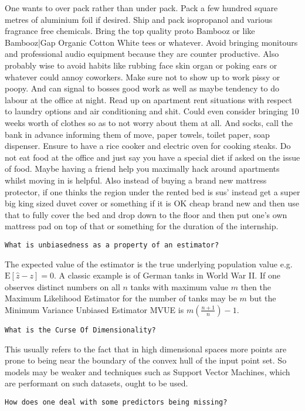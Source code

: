 One wants to over pack rather than under pack. Pack a few hundred square metres of aluminium foil if desired. Ship and pack isopropanol and various fragrance free chemicals. Bring the top quality proto Bambooz or like Bambooz|Gap Organic Cotton White tees or whatever. Avoid bringing monitours and professional audio equipment because they are counter productive. Also probably wise to avoid habits like rubbing face skin organ or poking ears or whatever could annoy coworkers. Make sure not to show up to work pissy or poopy. And can signal to bosses good work as well as maybe tendency to do labour at the office at night. Read up on apartment rent situations with respect to laundry options and air conditioning and shit. Could even consider bringing 10 weeks worth of clothes so as to not worry about them at all. And socks, call the bank in advance informing them of move, paper towels, toilet paper, soap dispenser. Ensure to have a rice cooker and electric oven for cooking steaks. Do not eat food at the office and just say you have a special diet if asked on the issue of food. Maybe having a friend help you maximally hack around apartments whilst moving in is helpful. Also instead of buying a brand new mattress protector, if one thinks the region under the rented bed is sus' instead get a super big king sized duvet cover or something if it is OK cheap brand new and then use that to fully cover the bed and drop down to the floor and then put one's own mattress pad on top of that or something for the duration of the internship.

\texttt{What is unbiasedness as a property of an estimator?}

The expected value of the estimator is the true underlying population value e.g. $\text{E}[\hat{z}-z] = 0$. A classic example is of German tanks in World War II. If one observes distinct numbers on all $n$ tanks with maximum value $m$ then the Maximum Likelihood Estimator for the number of tanks may be $m$ but the Minimum Variance Unbiased Estimator MVUE is $m \left ( \frac{n+1}{n} \right ) - 1$.

\texttt{What is the Curse Of Dimensionality?}

This usually refers to the fact that in high dimensional spaces more points are prone to being near the boundary of the convex hull of the input point set. So models may be weaker and techniques such as Support Vector Machines, which are performant on such datasets, ought to be used.

\texttt{How does one deal with some predictors being missing?}

